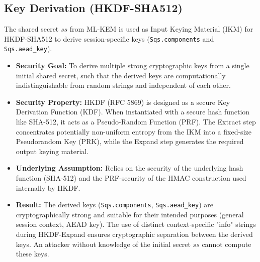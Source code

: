 \documentclass[11pt]{article}
\begin{document}
	\subsection{Key Derivation (HKDF-SHA512)}
	The shared secret $ss$ from ML-KEM is used as Input Keying Material (IKM) for HKDF-SHA512 to derive session-specific keys (\texttt{Sqs.components} and \texttt{Sqs.aead\_key}).
	\begin{itemize}
		\item \textbf{Security Goal:} To derive multiple strong cryptographic keys from a single initial shared secret, such that the derived keys are computationally indistinguishable from random strings and independent of each other.
		\item \textbf{Security Property:} HKDF (RFC 5869) is designed as a secure Key Derivation Function (KDF). When instantiated with a secure hash function like SHA-512, it acts as a Pseudo-Random Function (PRF). The Extract step concentrates potentially non-uniform entropy from the IKM into a fixed-size Pseudorandom Key (PRK), while the Expand step generates the required output keying material.
		\item \textbf{Underlying Assumption:} Relies on the security of the underlying hash function (SHA-512) and the PRF-security of the HMAC construction used internally by HKDF.
		\item \textbf{Result:} The derived keys (\texttt{Sqs.components}, \texttt{Sqs.aead\_key}) are cryptographically strong and suitable for their intended purposes (general session context, AEAD key). The use of distinct context-specific "info" strings during HKDF-Expand ensures cryptographic separation between the derived keys. An attacker without knowledge of the initial secret $ss$ cannot compute these keys.
	\end{itemize}
	
\end{document}
